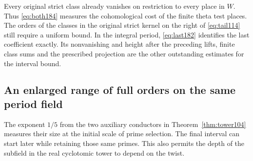 \documentclass[a4paper,11pt]{article}
\theoremstyle{definition}
\theoremstyle{remark}
\numberwithin{equation}{section}
\begin{document}
Every original strict class already vanishes on restriction
to every place in \(W\). Thus \eqref{eq:both184} measures
the cohomological cost of the finite theta test places.
The orders of the classes in the original strict kernel
on the right of \eqref{eq:tail114} still require a uniform
bound. In the integral period, \eqref{eq:last182} identifies
the last coefficient exactly. Its nonvanishing and height
after the preceding lifts, finite class sums and the
prescribed projection are the other outstanding estimates
for the interval bound.

\subsection{An enlarged range of full orders on the same period field}\label{nav:II-36}
The exponent \(1/5\) from the two auxiliary conductors in
Theorem~\ref{thm:tower104} measures their size at the initial
scale of prime selection. The final interval can start later
while retaining those same primes. This also permits the
depth of the subfield in the real cyclotomic tower to depend
on the twist.
\end{document}
